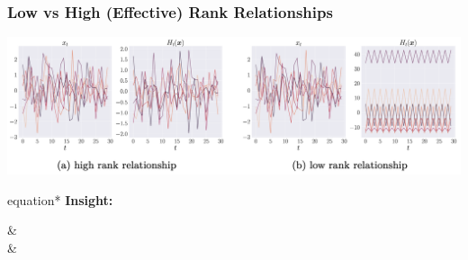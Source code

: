 \begin{frame}
	\frametitle{Low vs High (Effective) Rank Relationships}

	\begin{center}
		\includegraphics[width=\textwidth]{figures/low_high_rank.png}
	\end{center}

	\begin{empheq}[box=\mymath]{equation*}
		\textbf{Insight:}
		\qquad
		\begin{aligned}
			&\\
			&
		\end{aligned}
    \end{empheq}

\end{frame}
